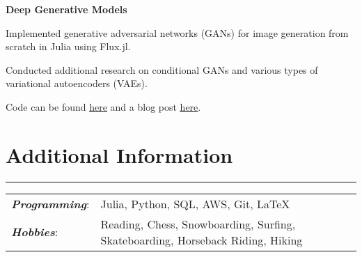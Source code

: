 \documentclass[9pt]{extarticle}
\newcommand{\myline}{\rule[\baselineskip]{\linewidth}{1pt}}
\begin{document}
\vspace{2.5pt}
\large\textbf{Deep Generative Models}
\normalsize

\begin{compactitem}
\item Implemented generative adversarial networks (GANs) for image generation from scratch in Julia using Flux.jl. 
\item Conducted additional research on conditional GANs and various types of variational autoencoders (VAEs).
\item Code can be found \href{https://github.com/aarontrowbridge/FluxGAN.jl}{\underline{here}} and a blog post \href{https://aarontrowbridge.github.io/posts/generative-adversarial-nets/}{\underline{here}}.
\end{compactitem}



\section{Additional Information}
\myline

\normalsize

\begin{tabular}{ll}
\textbf{\textit{Programming}}: & Julia, Python, SQL, AWS, Git, \LaTeX \\
\textbf{\textit{Hobbies}}: & Reading, Chess, Snowboarding, Surfing, Skateboarding, Horseback Riding, Hiking \\    
\end{tabular}
\end{document}
